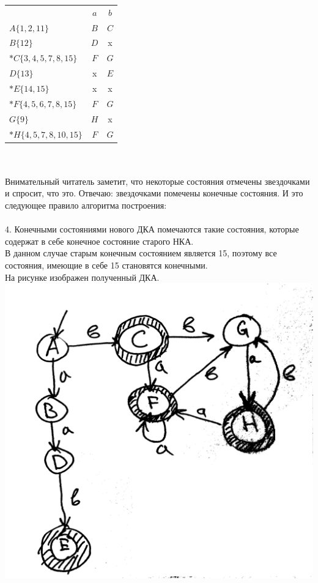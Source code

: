 \documentclass[14pt]{extreport}
\begin{document}
		\begin{tabular}{lcc}
			 & $a$ & $b$ \\
			$A\{1, 2, 11\}$ & $B$ & $C$ \\
			$B\{12\}$ & $D$ & x \\
			$*C\{3, 4, 5, 7, 8, 15\}$ & $F$ & $G$ \\
			$D\{13\}$ & x & $E$ \\
			$*E\{14, 15\}$ & x & x \\
			$*F\{4, 5, 6, 7, 8, 15\}$ & $F$ & $G$ \\
			$G\{9\}$ & $H$ & x \\
			$*H\{4, 5, 7, 8, 10, 15\}$ & $F$ & $G$ \\	
		\end{tabular}\\\\
	Внимательный читатель заметит, что некоторые состояния отмечены звездочками и
	спросит, что это. Отвечаю: звездочками помечены конечные состояния. И это следующее
	правило алгоритма построения:\\\\
	4. Конечными состояниями нового ДКА помечаются такие состояния, которые содержат в себе
	конечное состояние старого НКА.\\
	В данном случае старым конечным состоянием является 15, поэтому все состояния, имеющие в себе
	15 становятся конечными.\\
	На рисунке изображен полученный ДКА.\\
	\includegraphics[scale=0.11]{data/pic2_2.png}\\
\end{document}
